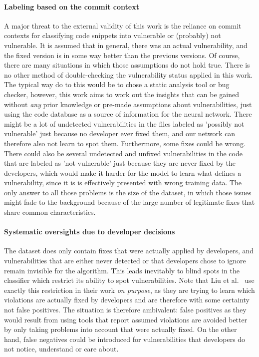 \documentclass[
a4paper,
pagesize,
pdftex,
12pt,
twoside, %
BCOR=5mm, %
ngerman,
fleqn,
final,
]{scrartcl}
\begin{document}
	\paragraph{Labeling based on the commit context}
	A major threat to the external validity of this work is the reliance on commit contexts for classifying code snippets into vulnerable or (probably) not vulnerable. It is assumed that in general, there was an actual vulnerability, and the fixed version is in some way better than the previous versions. Of course, there are many situations in which those assumptions do not hold true. There is no other method of double-checking the vulnerability status applied in this work. The typical way do to this would be to chose a static analysis tool or bug checker, however, this work aims to work out the insights that can be gained without \textit{any} prior knowledge or pre-made assumptions about vulnerabilities, just using the code database as a source of information for the neural network. There might be a lot of undetected vulnerabilities in the files labeled as 'possibly not vulnerable' just because no developer ever fixed them, and our network can therefore also not learn to spot them. Furthermore, some fixes could be wrong. There could also be several undetected and unfixed vulnerabilities in the code that are labeled as 'not vulnerable' just because they are never fixed by the developers, which would make it harder for the model to learn what defines a vulnerability, since it is is effectively presented with wrong training data. The only answer to all those problems is the size of the dataset, in which those issues might fade to the background because of the large number of legitimate fixes that share common characteristics.\\
	\paragraph{Systematic oversights due to developer decisions}
	The dataset does only contain fixes that were actually applied by developers, and vulnerabilities that are either never detected or that developers chose to ignore remain invisible for the algorithm. This leads inevitably to blind spots in the classifier which restrict its ability to spot vulnerabilities. Note that Liu et al.~\cite{Liu.2018} use exactly this restriction in their work \textit{on purpose}, as they are trying to learn which violations are actually fixed by developers and are therefore with some certainty  not false positives. The situation is therefore ambivalent: false positives as they would result from using tools that report assumed violations are avoided better by only taking problems into account that were actually fixed. On the other hand, false negatives could be introduced for vulnerabilities that developers do not notice, understand or care about.
\end{document}
